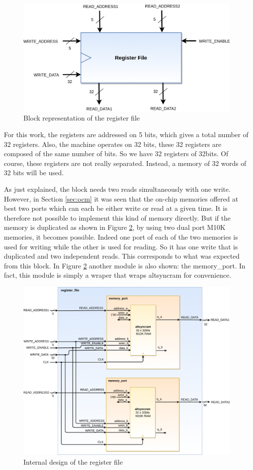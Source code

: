 \documentclass[12pt]{article}
\begin{document}
\begin{figure}[ht!]
\centering
\includegraphics[width=12cm]{res/machine/reg_file.png}
\caption{Block representation of the register file}
\label{fig:reg_file_block}
\end{figure}

\vspace{12pt}
For this work, the registers are addressed on 5 bits, which gives a total number of 32 registers. Also, the machine operates on 32 bits, these 32 registers are composed of the same number of bits. So we have 32 registers of 32bits. Of course, these registers are not really separated. Instead, a memory of 32 words of 32 bits will be used.

\vspace{12pt}
As just explained, the block needs two reads simultaneously with one write. However, in Section \ref{sec:ocm} it was seen that the on-chip memories offered at best two ports which can each be either write or read at a given time. It is therefore not possible to implement this kind of memory directly. But if the memory is duplicated as shown in Figure \ref{fig:reg_file}, by using two dual port M10K memories, it becomes possible. Indeed one port of each of the two memories is used for writing while the other is used for reading. So it has one write that is duplicated and two independent reads. This corresponds to what was expected from this block. In Figure \ref{fig:reg_file} another module is also shown: the memory\_port. In fact, this module is simply a wraper that wraps altsyncram for convenience.

\begin{figure}[ht!]
  \centering
  \includegraphics[width=\linewidth]{res/machine/reg_file_internal.png}
  \caption{Internal design of the register file}
  \label{fig:reg_file}
\end{figure}
\end{document}
